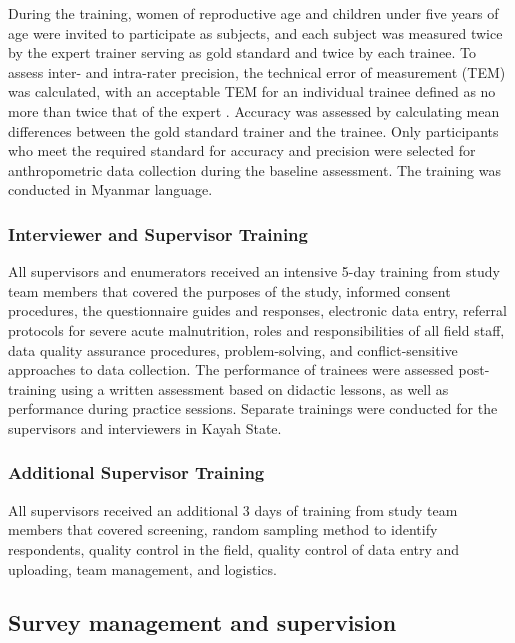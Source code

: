 \documentclass[12pt,a4paper]{article}
\begin{document}
During the training, women of reproductive age and children under five years of age were invited to participate as subjects, and each subject was measured twice by the expert trainer serving as gold standard and twice by each trainee. To assess inter- and intra-rater precision, the technical error of measurement (TEM) was calculated, with an acceptable TEM for an individual trainee defined as no more than twice that of the expert \citep{ulijaszek_kerr_1999}. Accuracy was assessed by calculating mean differences between the gold standard trainer and the trainee. Only participants who meet the required standard for accuracy and precision were selected for anthropometric data collection during the baseline assessment. The training was conducted in Myanmar language.

\hypertarget{interview-training}{%
\subsubsection{Interviewer and Supervisor Training}\label{interview-training}}

All supervisors and enumerators received an intensive 5-day training from study team members that covered the purposes of the study, informed consent procedures, the questionnaire guides and responses, electronic data entry, referral protocols for severe acute malnutrition, roles and responsibilities of all field staff, data quality assurance procedures, problem-solving, and conflict-sensitive approaches to data collection. The performance of trainees were assessed post-training using a written assessment based on didactic lessons, as well as performance during practice sessions. Separate trainings were conducted for the supervisors and interviewers in Kayah State.

\hypertarget{add-training}{%
\subsubsection{Additional Supervisor Training}\label{add-training}}

All supervisors received an additional 3 days of training from study team members that covered screening, random sampling method to identify respondents, quality control in the field, quality control of data entry and uploading, team management, and logistics.

\hypertarget{survy-management}{%
\subsection{Survey management and supervision}\label{survy-management}}
\end{document}
